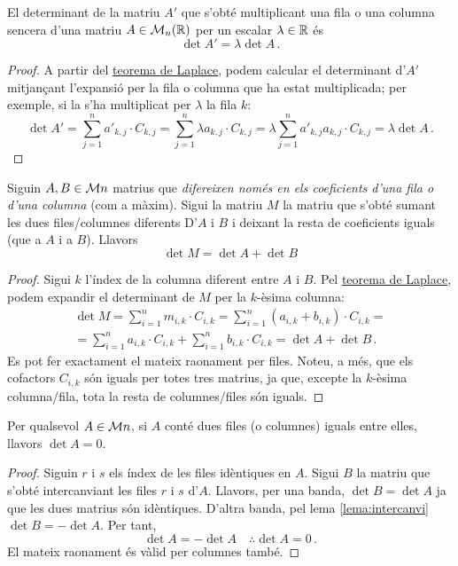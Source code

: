 \begin{prop}\label{prop:filaescalada}
	El determinant de la matriu $A'$ que s'obté multiplicant una fila o una columna sencera d'una matriu $A\in\mathcal{M}_n(\mathbb{R})$ per un escalar $\lambda\in\mathbb{R}$ és \[\det A' = \lambda\det A\,.\]
	\begin{proof}
		A partir del \hyperref[teo:laplace]{teorema de Laplace}, podem calcular el determinant d'$A'$ mitjançant l'expansió per la fila o columna que ha estat multiplicada; per exemple, si la s'ha multiplicat per $\lambda$ la fila $k$:
		\[\det A' = \sum_{j=1}^{n} {a'}_{k,j}\cdot C_{k,j} =\sum_{j=1}^{n} \lambda {a}_{k,j} \cdot C_{k,j} = \lambda \sum_{j=1}^{n} {a'}_{k,j} {a}_{k,j} \cdot C_{k,j} = \lambda\det A\,. \]
	\end{proof}
\end{prop}

\begin{prop}\label{prop:sumafila}
	Siguin $A,B\in\mathcal{M}{n}$ matrius que \textit{difereixen només en els coeficients d'una fila o d'una columna} (com a màxim). Sigui la matriu $M$ la matriu que s'obté sumant les dues files/columnes diferents D'$A$ i $B$ i deixant la resta de coeficients iguals (que a $A$ i a $B$). Llavors \[\det M = \det A + \det B \]
	\begin{proof}
		Sigui $k$ l'índex de la columna diferent entre $A$ i $B$. Pel \hyperref[teo:laplace]{teorema de Laplace}, podem expandir el determinant de $M$ per la $k$-èsima columna:
		\begin{multline*}
			\det M = \sum_{i=1}^{n} {m}_{i,k}\cdot C_{i,k} = \sum_{i=1}^{n} ({a}_{i,k}+ {b}_{i,k})\cdot C_{i,k}=\\
			=\sum_{i=1}^{n}{a}_{i,k}\cdot C_{i,k} +\sum_{i=1}^{n} {b}_{i,k}\cdot C_{i,k}=\det A + \det B\,.
		\end{multline*}
		Es pot fer exactament el mateix raonament per files. Noteu, a més, que els cofactors $C_{i,k}$ són iguals per totes tres matrius, ja que, excepte la $k$-èsima columna/fila, tota la resta de columnes/files són iguals.
	\end{proof}
\end{prop}

\begin{prop}\label{prop:filaigual}
	Per qualsevol $A\in\mathcal{M}{n}$, si $A$ conté dues files (o columnes) iguals entre elles, llavors $\det A = 0$.
	\begin{proof}
		Siguin $r$ i $s$ els índex de les files idèntiques en $A$. Sigui $B$ la matriu que s'obté intercanviant les files $r$ i $s$ d'$A$. Llavors, per una banda, $\det B = \det A$ ja que les dues matrius són idèntiques. D'altra banda, pel lema \ref{lema:intercanvi} $\det B = -\det A$. Per tant, \[\det A = -\det A \quad \therefore \det A = 0\,. \] El mateix raonament és vàlid per columnes també.
	\end{proof}
\end{prop}

